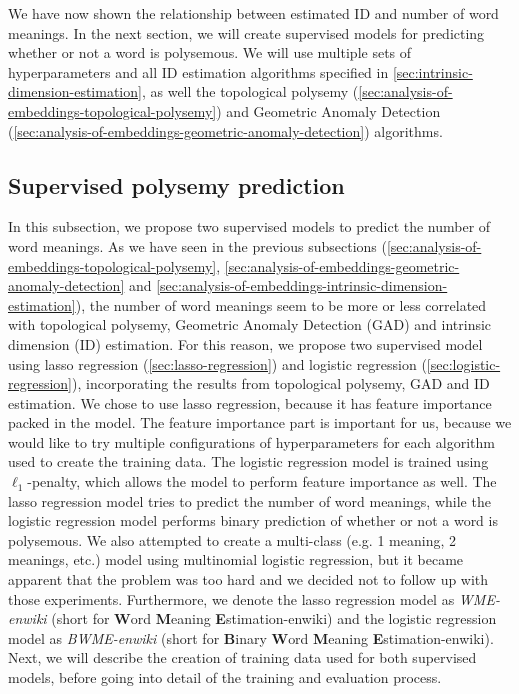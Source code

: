 We have now shown the relationship between estimated ID and number of word meanings. In the next section, we will create supervised models for predicting whether or not a word is polysemous. We will use multiple sets of hyperparameters and all ID estimation algorithms specified in \cref{sec:intrinsic-dimension-estimation}, as well the topological polysemy (\cref{sec:analysis-of-embeddings-topological-polysemy}) and Geometric Anomaly Detection (\cref{sec:analysis-of-embeddings-geometric-anomaly-detection}) algorithms.

\subsection{Supervised polysemy prediction}
\label{sec:analysis-of-embeddings-supervised-polysemy-prediction}
In this subsection, we propose two supervised models to predict the number of word meanings. As we have seen in the previous subsections (\cref{sec:analysis-of-embeddings-topological-polysemy}, \cref{sec:analysis-of-embeddings-geometric-anomaly-detection} and \cref{sec:analysis-of-embeddings-intrinsic-dimension-estimation}), the number of word meanings seem to be more or less correlated with topological polysemy, Geometric Anomaly Detection (GAD) and intrinsic dimension (ID) estimation. For this reason, we propose two supervised model using lasso regression (\cref{sec:lasso-regression}) and logistic regression (\cref{sec:logistic-regression}), incorporating the results from topological polysemy, GAD and ID estimation. We chose to use lasso regression, because it has feature importance packed in the model. The feature importance part is important for us, because we would like to try multiple configurations of hyperparameters for each algorithm used to create the training data. The logistic regression model is trained using $\ell_1$-penalty, which allows the model to perform feature importance as well. The lasso regression model tries to predict the number of word meanings, while the logistic regression model performs binary prediction of whether or not a word is polysemous. We also attempted to create a multi-class (e.g. 1 meaning, 2 meanings, etc.) model using multinomial logistic regression, but it became apparent that the problem was too hard and we decided not to follow up with those experiments. Furthermore, we denote the lasso regression model as \textit{WME-enwiki} (short for \textbf{W}ord \textbf{M}eaning \textbf{E}stimation-enwiki) and the logistic regression model as \textit{BWME-enwiki} (short for \textbf{B}inary \textbf{W}ord \textbf{M}eaning \textbf{E}stimation-enwiki). Next, we will describe the creation of training data used for both supervised models, before going into detail of the training and evaluation process.

